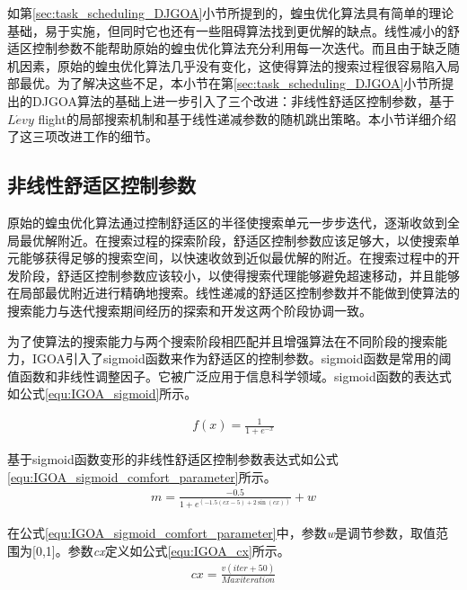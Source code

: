 如第\ref{sec:task_scheduling_DJGOA}小节所提到的，蝗虫优化算法具有简单的理论基础，易于实施，但同时它也还有一些阻碍算法找到更优解的缺点。线性减小的舒适区控制参数不能帮助原始的蝗虫优化算法充分利用每一次迭代。而且由于缺乏随机因素，原始的蝗虫优化算法几乎没有变化，这使得算法的搜索过程很容易陷入局部最优。为了解决这些不足，本小节在第\ref{sec:task_scheduling_DJGOA}小节所提出的DJGOA算法的基础上进一步引入了三个改进：非线性舒适区控制参数，基于$L\acute{e}vy $ flight的局部搜索机制和基于线性递减参数的随机跳出策略。本小节详细介绍了这三项改进工作的细节。

\subsection{非线性舒适区控制参数}
原始的蝗虫优化算法通过控制舒适区的半径使搜索单元一步步迭代，逐渐收敛到全局最优解附近。在搜索过程的探索阶段，舒适区控制参数应该足够大，以使搜索单元能够获得足够的搜索空间，以快速收敛到近似最优解的附近。在搜索过程中的开发阶段，舒适区控制参数应该较小，以使得搜索代理能够避免超速移动，并且能够在局部最优附近进行精确地搜索。线性递减的舒适区控制参数并不能做到使算法的搜索能力与迭代搜索期间经历的探索和开发这两个阶段协调一致。

为了使算法的搜索能力与两个搜索阶段相匹配并且增强算法在不同阶段的搜索能力，IGOA引入了sigmoid函数来作为舒适区的控制参数。sigmoid函数是常用的阈值函数和非线性调整因子。它被广泛应用于信息科学领域。sigmoid函数的表达式如公式\ref{equ:IGOA_sigmoid}所示。

\begin{eqnarray}\label{equ:IGOA_sigmoid}
	f(x)=\frac{1}{1+e^{-x}}
\end{eqnarray}

基于sigmoid函数变形的非线性舒适区控制参数表达式如公式\ref{equ:IGOA_sigmoid_comfort_parameter}所示。
\begin{eqnarray}\label{equ:IGOA_sigmoid_comfort_parameter}
    m=\frac{-0.5}{1+e^{(-1.5(cx-5)+2\sin(cx))}}+w
\end{eqnarray}

在公式\ref{equ:IGOA_sigmoid_comfort_parameter}中，参数\emph{w}是调节参数，取值范围为[0,1]。参数\emph{cx}定义如公式\ref{equ:IGOA_cx}所示。
\begin{eqnarray}\label{equ:IGOA_cx}
	cx=\frac{v(iter+50)}{Maxiteration}
\end{eqnarray}

